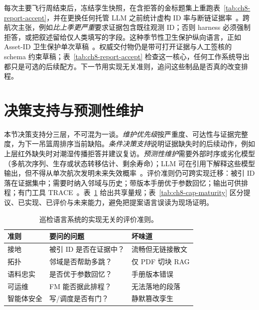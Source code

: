 每次主要飞行周结束后，冻结孪生快照，在含拒答的金标题集上重跑表~\ref{tab:ch8-report-accept}，并在更换任何托管 LLM 之前统计虚构 ID 率与断链证据率~\cite{liang2023helm,zhang2025}。跨航次主张，例如\emph{比上季更严重}要求证据包含既往观测 ID；否则 harness 必须强制拒答，或把叙述留给仅人类填写的字段。这种季节性卫生保护纵向语言，正如 Asset-ID 卫生保护单次草稿~\cite{chen2023facility,krutli2025fmrags}。权威交付物仍是带可打开证据与人工签核的 schema 约束草稿；表~\ref{tab:ch8-report-accept} 检查这一核心，任何工作系统导出都只是可选的后续配方。下一节用实现无关准则，追问这些制品是否真的改变排程。

\section{决策支持与预测性维护}
\label{sec:ch8-dss}

本节决策支持分三层，不可混为一谈。\emph{维护优先级}按严重度、可达性与证据完整度，为下一吊篮周排序当前缺陷。\emph{条件决策支持}说明证据缺失时的后续动作，例如上层红外缺失时对潮湿传播拒答并建议复访。\emph{预测性维护}需要外部时序或劣化模型（多航次序列、生存或状态转移估计、剩余寿命）；LLM 可在引用下解释这些模型输出，但不得从单次航次发明未来失效概率~\cite{chen2023facility,zhao2026physical}。评价准则仍可跨实现迁移：被引 ID 落在证据集中；需要时纳入邻域与历史；带版本手册优于参数回忆；输出可供排程；有门工具 TRACE~\cite{ji2023,lee2024ragsafety,luo2025llmdtrobot}。表~\ref{tab:ch8-eval} 给出共享量规；表~\ref{tab:ch8-cap-maturity} 区分提议、已实现、已评价与未来能力，避免把提案语言误读为现场证明。

\begin{table}[htbp]
\centering
\caption{巡检语言系统的实现无关的评价准则。}
\label{tab:ch8-eval}
\begin{tabular}{llp{4.8cm}}
\toprule
准则 & 要问的问题 & 坏味道 \\
\midrule
接地 & 被引 ID 是否在证据中？ & 流畅但无链接散文 \\
拓扑 & 邻域是否帮助多跳？ & 仅 PDF 切块 RAG \\
语料忠实 & 是否优于参数回忆？ & 手册版本错误 \\
可运维 & FM 能否据此排程？ & 无法落地的段落 \\
智能体安全 & 写/调度是否有门？ & 静默篡改孪生 \\
\bottomrule
\end{tabular}
\end{table}

